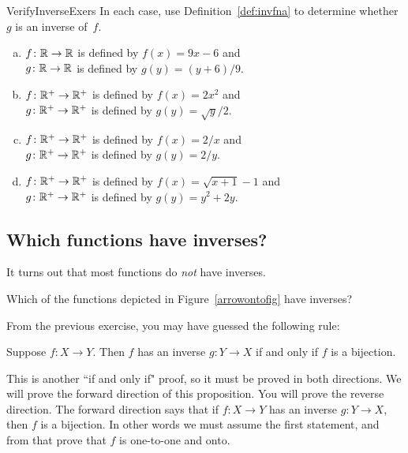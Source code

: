  \begin{exercise}{VerifyInverseExers}
 In each case, use Definition~\ref{def:invfna} to determine whether $g$ is an inverse of~$f$.
 \begin{enumerate}[(a)]
 \item \label{VerifyInverseExers-(9x-6)}
$f \colon \mathbb{R} \to \mathbb{R}$ is defined by $f(x) = 9x - 6$ and 
 \\ $g \colon \mathbb{R} \to \mathbb{R}$ is defined by $g(y) = (y + 6)/9$.
 \item \label{VerifyInverseExers-(x^2)}
$f \colon \mathbb{R}^+ \to \mathbb{R}^+$ is defined by $f(x) =2x^2$ and 
 \\ $g \colon \mathbb{R}^+ \to \mathbb{R}^+$ is defined by $g(y) = \sqrt{y}/2$.
 \item \label{VerifyInverseExers-(1/x)}
$f \colon \mathbb{R}^+ \to \mathbb{R}^+$ is defined by $f(x) = 2/x$ and 
 \\ $g \colon \mathbb{R}^+ \to \mathbb{R}^+$ is defined by $g(y) = 2/y$.
 \item \label{VerifyInverseExers-(sqrt(x+1)-1)}
$f \colon \mathbb{R}^+ \to \mathbb{R}^+$ is defined by $f(x) = \sqrt{x+1} - 1$ and 
 \\ $g \colon \mathbb{R}^+ \to \mathbb{R}^+$ is defined by $g(y) = y^2 + 2y$.
 \end{enumerate}
 \end{exercise}
   
\subsection{Which functions have inverses?}\label{subsec:fun:inv}

It turns out that most functions do \emph{not} have inverses.  

\begin{exercise}{92}
Which of the functions depicted  in Figure~\ref{arrowontofig} have inverses?
 \end{exercise}

From the previous exercise, you may have guessed the following rule:

 \begin{thmprop} \label{InverseBijection}
 Suppose $f\colon X \to Y$. Then $f$ has an inverse $g \colon Y \to X$ if and only if $f$ is a bijection.
 \end{thmprop}
 
 This is another ``if and only if" proof, so it must be proved in both directions. We will prove the forward direction of this proposition.  You will prove the reverse direction.  The forward direction says that if $f \colon X \to Y$ has an inverse $g \colon Y \to X$, then $f$ is a bijection.  In other words we must assume the first statement, and from that prove that $f$ is one-to-one and onto.

